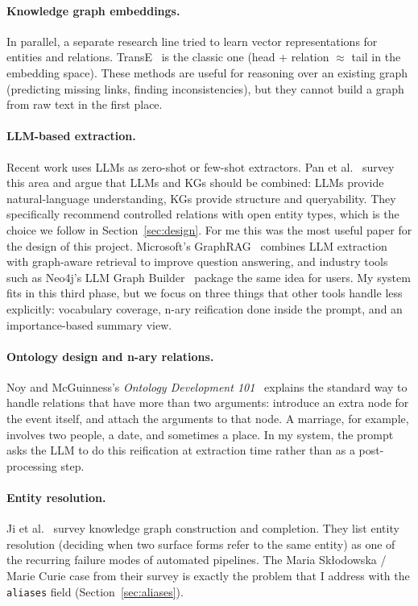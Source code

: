 \documentclass[11pt,a4paper]{article}
\begin{document}
\paragraph{Knowledge graph embeddings.}
In parallel, a separate research line tried to learn vector representations for entities and relations. TransE~\cite{bordes2013translating} is the classic one (head + relation $\approx$ tail in the embedding space). These methods are useful for reasoning over an existing graph (predicting missing links, finding inconsistencies), but they cannot build a graph from raw text in the first place.

\paragraph{LLM-based extraction.}
Recent work uses LLMs as zero-shot or few-shot extractors. Pan et al.~\cite{pan2024unifying} survey this area and argue that LLMs and KGs should be combined: LLMs provide natural-language understanding, KGs provide structure and queryability. They specifically recommend controlled relations with open entity types, which is the choice we follow in Section~\ref{sec:design}. For me this was the most useful paper for the design of this project. Microsoft's GraphRAG~\cite{edge2024graphrag} combines LLM extraction with graph-aware retrieval to improve question answering, and industry tools such as Neo4j's LLM Graph Builder~\cite{neo4j2024llmgraphbuilder} package the same idea for users. My system fits in this third phase, but we focus on three things that other tools handle less explicitly: vocabulary coverage, n-ary reification done inside the prompt, and an importance-based summary view.

\paragraph{Ontology design and n-ary relations.}
Noy and McGuinness's \emph{Ontology Development 101}~\cite{noy2001ontology} explains the standard way to handle relations that have more than two arguments: introduce an extra node for the event itself, and attach the arguments to that node. A marriage, for example, involves two people, a date, and sometimes a place. In my system, the prompt asks the LLM to do this reification at extraction time rather than as a post-processing step.

\paragraph{Entity resolution.}
Ji et al.~\cite{ji2022survey} survey knowledge graph construction and completion. They list entity resolution (deciding when two surface forms refer to the same entity) as one of the recurring failure modes of automated pipelines. The Maria Sk\l odowska / Marie Curie case from their survey is exactly the problem that I address with the \texttt{aliases} field (Section~\ref{sec:aliases}).
\end{document}
